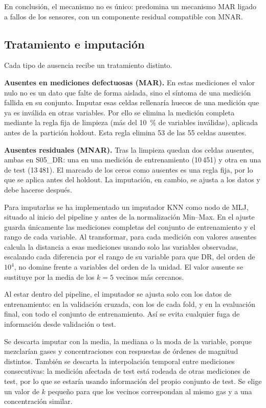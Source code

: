 En conclusión, el mecanismo no es único: predomina un mecanismo MAR ligado a fallos de los
sensores, con un componente residual compatible con MNAR.

\subsection{Tratamiento e imputación}

Cada tipo de ausencia recibe un tratamiento distinto.

\textbf{Ausentes en mediciones defectuosas (MAR).} En estas mediciones el valor nulo no es un
dato que falte de forma aislada, sino el síntoma de una medición fallida en su conjunto. Imputar
esas celdas rellenaría huecos de una medición que ya es inválida en otras variables. Por ello se
elimina la medición completa mediante la regla fija de limpieza (más del 10~\% de variables
inválidas), aplicada antes de la partición holdout. Esta regla elimina 53 de las 55 celdas
ausentes.

\textbf{Ausentes residuales (MNAR).} Tras la limpieza quedan dos celdas ausentes, ambas en
S05\_DR: una en una medición de entrenamiento (10\,451) y otra en una de test (13\,481). El
marcado de los ceros como ausentes es una regla fija, por lo que se aplica antes del holdout.
La imputación, en cambio, se ajusta a los datos y debe hacerse después.

Para imputarlas se ha implementado un imputador KNN como nodo de MLJ, situado al inicio del
pipeline y antes de la normalización Min--Max. En el ajuste guarda únicamente las mediciones
completas del conjunto de entrenamiento y el rango de cada variable. Al transformar, para cada
medición con valores ausentes calcula la distancia a esas mediciones usando solo las variables
observadas, escalando cada diferencia por el rango de su variable para que DR, del orden de
$10^4$, no domine frente a variables del orden de la unidad. El valor ausente se sustituye por
la media de los $k = 5$ vecinos más cercanos.

Al estar dentro del pipeline, el imputador se ajusta solo con los datos de entrenamiento: en la
validación cruzada, con los de cada fold, y en la evaluación final, con todo el conjunto de
entrenamiento. Así se evita cualquier fuga de información desde validación o test.

Se descarta imputar con la media, la mediana o la moda de la variable, porque mezclarían gases
y concentraciones con respuestas de órdenes de magnitud distintos. También se descarta la
interpolación temporal entre mediciones consecutivas: la medición afectada de test está
rodeada de otras mediciones de test, por lo que se estaría usando información del propio
conjunto de test. Se elige un valor de $k$ pequeño para que los vecinos correspondan al mismo
gas y a una concentración similar.

